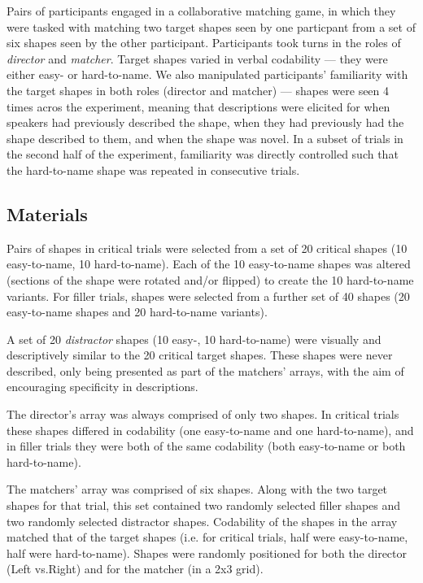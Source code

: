 \documentclass[a4paper,man,natbib]{apa6}
\newcommand*{\term}[1]{\emph{#1}} %
\begin{document}
Pairs of participants engaged in a collaborative matching game, in which they were tasked with matching two target shapes seen by one particpant from a set of six shapes seen by the other participant. 
Participants took turns in the roles of \term{director} and \term{matcher}.
Target shapes varied in verbal codability --- they were either easy- or hard-to-name.
We also manipulated participants' familiarity with the target shapes in both roles (director and matcher) --- shapes were seen 4 times acros the experiment, meaning that descriptions were elicited for when speakers had previously described the shape, when they had previously had the shape described to them, and when the shape was novel. 
In a subset of trials in the second half of the experiment, familiarity was directly controlled such that the hard-to-name shape was repeated in consecutive trials. 


\subsection{Materials}
Pairs of shapes in critical trials were selected from a set of 20 critical shapes (10 easy-to-name, 10 hard-to-name).
Each of the 10 easy-to-name shapes was altered (sections of the shape were rotated and/or flipped) to create the 10 hard-to-name variants. %
For filler trials, shapes were selected from a further set of 40 shapes (20 easy-to-name shapes and 20 hard-to-name variants). 

A set of 20 \term{distractor} shapes (10 easy-, 10 hard-to-name) were visually and descriptively similar to the 20 critical target shapes. %
These shapes were never described, only being presented as part of the matchers' arrays, with the aim of encouraging specificity in descriptions.

The director's array was always comprised of only two shapes.
In critical trials these shapes differed in codability (one easy-to-name and one hard-to-name), and in filler trials they were both of the same codability (both easy-to-name or both hard-to-name).

The matchers' array was comprised of six shapes.
Along with the two target shapes for that trial, this set contained two randomly selected filler shapes and two randomly selected distractor shapes. 
Codability of the shapes in the array matched that of the target shapes (i.e. for critical trials, half were easy-to-name, half were hard-to-name).
Shapes were randomly positioned for both the director (Left vs.\@ Right) and for the matcher (in a 2x3 grid).
\end{document}
